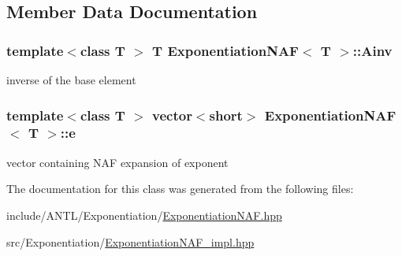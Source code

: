 \subsection{Member Data Documentation}
\hypertarget{classExponentiationNAF_ae74221c4e5a501c9919d229c92fd87a0}{
\subsubsection[{Ainv}]{\setlength{\rightskip}{0pt plus 5cm}template$<$class T $>$ T {\bf Exponentiation\-N\-A\-F}$<$ T $>$\-::Ainv\hspace{0.3cm}{\ttfamily [protected]}}}\label{classExponentiationNAF_ae74221c4e5a501c9919d229c92fd87a0}
inverse of the base element \hypertarget{classExponentiationNAF_a466325261b0b566860678ca2e0622ba4}{
\subsubsection[{e}]{\setlength{\rightskip}{0pt plus 5cm}template$<$class T $>$ vector$<$short$>$ {\bf Exponentiation\-N\-A\-F}$<$ T $>$\-::e\hspace{0.3cm}{\ttfamily [protected]}}}\label{classExponentiationNAF_a466325261b0b566860678ca2e0622ba4}
vector containing N\-A\-F expansion of exponent 

The documentation for this class was generated from the following files\-:\begin{DoxyCompactItemize}
\item 
include/\-A\-N\-T\-L/\-Exponentiation/\hyperlink{ExponentiationNAF_8hpp}{Exponentiation\-N\-A\-F.\-hpp}\item 
src/\-Exponentiation/\hyperlink{ExponentiationNAF__impl_8hpp}{Exponentiation\-N\-A\-F\-\_\-impl.\-hpp}\end{DoxyCompactItemize}
